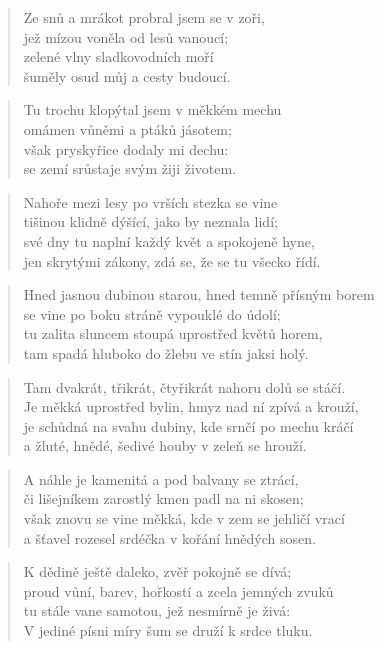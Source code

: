 \documentclass{book}
\begin{document}
\begin{verse}
Ze snů a mrákot probral jsem se v zoři,\\
jež mízou voněla od lesů vanoucí;\\
zelené vlny sladkovodních moří\\
šuměly osud můj a cesty budoucí.
\end{verse}
\begin{verse}
Tu trochu klopýtal jsem v měkkém mechu\\
omámen vůněmi a ptáků jásotem;\\
však pryskyřice dodaly mi dechu:\\
se zemí srůstaje svým žiji životem.
\end{verse}
\newpage
{}
\begin{verse}
Nahoře mezi lesy po vrších stezka se vine\\
tišinou klidně dýšící, jako by neznala lidí;\\
své dny tu naplní každý květ a spokojeně hyne,\\
jen skrytými zákony, zdá se, že se tu všecko řídí.
\end{verse}
\begin{verse}
Hned jasnou dubinou starou, hned temně přísným borem\\
se vine po boku stráně vypouklé do údolí;\\
tu zalita sluncem stoupá uprostřed květů horem,\\
tam spadá hluboko do žlebu ve stín jaksi holý.
\end{verse}
\begin{verse}
Tam dvakrát, třikrát, čtyřikrát nahoru dolů se stáčí.\\
Je měkká uprostřed bylin, hmyz nad ní zpívá a krouží,\\
je schůdná na svahu dubiny, kde srnčí po mechu kráčí\\
a žluté, hnědé, šedivé houby v zeleň se hrouží.
\end{verse}
\begin{verse}
A náhle je kamenitá a pod balvany se ztrácí,\\
či lišejníkem zarostlý kmen padl na ni skosen;\\
však znovu se vine měkká, kde v zem se jehličí vrací\\
a šťavel rozesel srdéčka v kořání hnědých sosen.
\end{verse}
\begin{verse}
K dědině ještě daleko, zvěř pokojně se dívá;\\
proud vůní, barev, hořkostí a zcela jemných zvuků\\
tu stále vane samotou, jež nesmírně je živá:\\
V jediné písni míry šum se druží k srdce tluku.
\end{verse}
\end{document}
